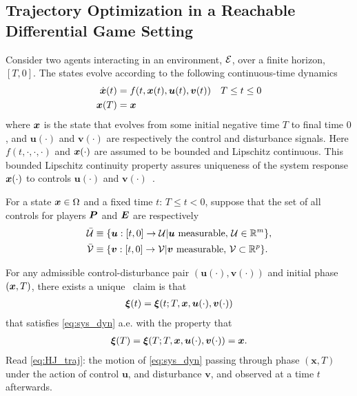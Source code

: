 
\subsection{Trajectory Optimization in a Reachable Differential Game Setting}
\noindent Consider two agents interacting in an environment, $\mathcal{E}$, over a finite horizon, $[T, 0]$. The states evolve according to the following continuous-time dynamics
%
	\begin{align}
		\dot{\state}(t) &= f(t, \state(t), \bm{u}(t), \bm{v}(t)) \quad T \le t \le 0 \\
		\state(T) &= \state \nonumber
		\label{eq:sys_dyn}
	\end{align}
%
\noindent where $\bm{x}$ is the state that evolves from some initial negative time $T$ to final time $0$, and $\bm{u}(\cdot)$ and $\bm{v}(\cdot)$ are respectively the control and disturbance signals. Here $f(t, \cdot, \cdot, \cdot)$ and $\bm{x}(\cdot)$ are assumed to be bounded and Lipschitz continuous. This bounded Lipschitz continuity property assures uniqueness of the system response $\bm{x}(\cdot)$ to controls $\bm{u}(\cdot)$ and $\bm{v}(\cdot)$~\citet{Souganidis}. %

For a state $\bm{x} \in \Omega$ and a fixed time $t$: $T \le t < 0$, suppose that the set of all controls for players $\bm{P}$ and $\bm{E}$ are respectively
%
\begin{align}
	\mathcal{\bar{U}} &\equiv \{\bm{u}: [t, 0] \rightarrow \mathcal{U} | \bm{u} \text{ measurable}, \, \mathcal{U} \in \mathbb{R}^m \}, \\
	\mathcal{\bar{V}} &\equiv \{\bm{v}: [t, 0] \rightarrow \mathcal{V} | \bm{v} \text{ measurable},  \,\mathcal{V} \subset \mathbb{R}^p\}.
\end{align}

For any admissible control-disturbance pair $(\bm{u}(\cdot), \bm{v}(\cdot))$ and initial phase $(\bm{x}, T)$,  there exists a unique~\citet{Crandall1983viscosity, Evans1984} claim is that %
%
\begin{align}
	\bm{\xi}(t) = \bm{\xi}(t; T, \state, \bm{u}(\cdot), \bm{v}(\cdot))
	\label{eq:HJ_traj}
\end{align}
%
that satisfies \eqref{eq:sys_dyn} a.e. with the property that
\begin{align}
	\bm{\xi}(T) = \bm{\xi}(T; T, \bm{x}, \bm{u}(\cdot), \bm{v}(\cdot)) = \bm{x}.
\end{align}
%
Read \eqref{eq:HJ_traj}: the motion of \eqref{eq:sys_dyn} passing through phase $(\bm{x}, T)$ under the action of control $\bm{u}$, and disturbance $\bm{v}$, and observed at a time $t$ afterwards. 

